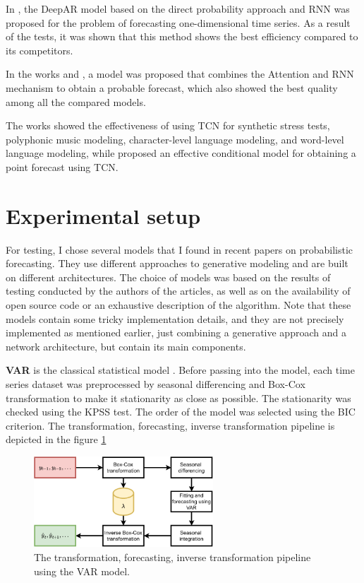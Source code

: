 \documentclass[12pt,a4paper]{article}
\begin{document}
In \cite{deepar}, the DeepAR model based on the direct probability approach and RNN was proposed for the problem of forecasting one-dimensional time series. As a result of the tests, it was shown that this method shows the best efficiency compared to its competitors.

In the works \cite{multihorizon} and \cite{interpr}, a model was proposed that combines the Attention and RNN mechanism to obtain a probable forecast, which also showed the best quality among all the compared models.

The works \cite{BaiTCN2018} showed the effectiveness of using TCN for synthetic stress tests, polyphonic music modeling, character-level language modeling, and word-level language modeling, while \cite{borovykh2018conditional} proposed an effective conditional model for obtaining a point forecast using TCN.

\section{Experimental setup}

For testing, I chose several models that I found in recent papers on probabilistic forecasting. They use different approaches to generative modeling and are built on different architectures. The choice of models was based on the results of testing conducted by the authors of the articles, as well as on the availability of open source code or an exhaustive description of the algorithm. Note that these models contain some tricky implementation details, and they are not precisely implemented as mentioned earlier, just combining a generative approach and a network architecture, but contain its main components.

\textbf{VAR} is the classical statistical model \cite{fpp3}. Before passing into the model, each time series dataset was preprocessed by seasonal differencing and Box-Cox transformation to make it stationarity as close as possible. The stationarity was checked using the KPSS test. The order of the model was selected using the BIC criterion. The transformation, forecasting, inverse transformation pipeline is depicted in the figure \ref{fig:transformation_var}

\begin{figure}[!ht]
    \centering
    \includegraphics[width=0.6\textwidth]{figures/transformation_var.pdf}
    \caption{The transformation, forecasting, inverse transformation pipeline using the VAR model.}
    \label{fig:transformation_var}
\end{figure}
\end{document}
